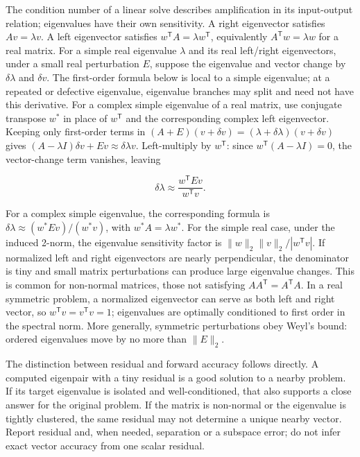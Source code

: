 The condition number of a linear solve describes amplification in its input-output relation; eigenvalues have their own sensitivity. A right eigenvector satisfies \(Av=\lambda v\). A left eigenvector satisfies \(w^\mathsf TA=\lambda w^\mathsf T\), equivalently \(A^\mathsf Tw=\lambda w\) for a real matrix. For a simple real eigenvalue \(\lambda\) and its real left/right eigenvectors, under a small real perturbation \(E\), suppose the eigenvalue and vector change by \(\delta\lambda\) and \(\delta v\). The first-order formula below is local to a simple eigenvalue; at a repeated or defective eigenvalue, eigenvalue branches may split and need not have this derivative. For a complex simple eigenvalue of a real matrix, use conjugate transpose \(w^*\) in place of \(w^\mathsf T\) and the corresponding complex left eigenvector. Keeping only first-order terms in \((A+E)(v+\delta v)=(\lambda+\delta\lambda)(v+\delta v)\) gives \((A-\lambda I)\delta v+Ev\approx\delta\lambda v\). Left-multiply by \(w^\mathsf T\): since \(w^\mathsf T(A-\lambda I)=0\), the vector-change term vanishes, leaving

\[
\delta\lambda\approx\frac{w^\mathsf TEv}{w^\mathsf Tv}.
\]

For a complex simple eigenvalue, the corresponding formula is \(\delta\lambda\approx(w^*Ev)/(w^*v)\), with \(w^*A=\lambda w^*\). For the simple real case, under the induced 2-norm, the eigenvalue sensitivity factor is \(\|w\|_2\|v\|_2/|w^\mathsf Tv|\). If normalized left and right eigenvectors are nearly perpendicular, the denominator is tiny and small matrix perturbations can produce large eigenvalue changes. This is common for non-normal matrices, those not satisfying \(AA^\mathsf T=A^\mathsf TA\). In a real symmetric problem, a normalized eigenvector can serve as both left and right vector, so \(w^\mathsf Tv=v^\mathsf Tv=1\); eigenvalues are optimally conditioned to first order in the spectral norm. More generally, symmetric perturbations obey Weyl's bound: ordered eigenvalues move by no more than \(\|E\|_2\).

The distinction between residual and forward accuracy follows directly. A computed eigenpair with a tiny residual is a good solution to a nearby problem. If its target eigenvalue is isolated and well-conditioned, that also supports a close answer for the original problem. If the matrix is non-normal or the eigenvalue is tightly clustered, the same residual may not determine a unique nearby vector. Report residual and, when needed, separation or a subspace error; do not infer exact vector accuracy from one scalar residual.

